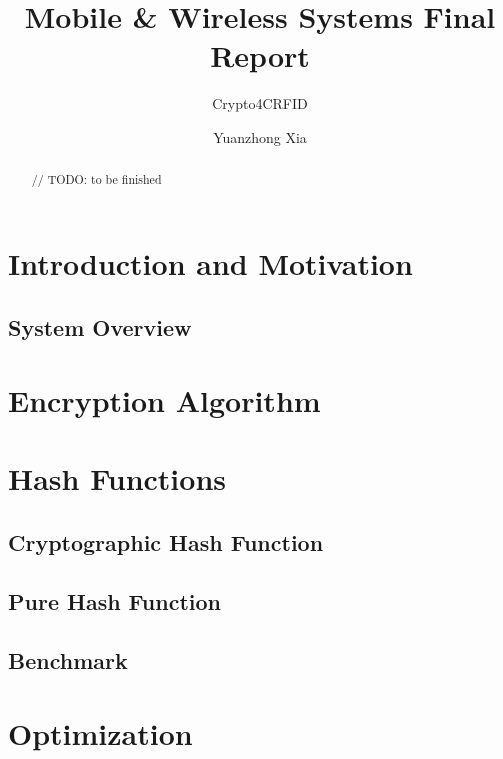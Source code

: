 \documentclass[sigconf, review=false]{acmart}
\begin{document}
\title{Mobile & Wireless Systems Final Report}
\subtitle{Crypto4CRFID}

\author{Yuanzhong Xia}

\begin{abstract}
    // TODO: to be finished

\end{abstract}
\maketitle



\section{Introduction and Motivation}

\subsection{System Overview}


\section{Encryption Algorithm}


\section{Hash Functions}
\subsection{Cryptographic Hash Function}

\subsection{Pure Hash Function}

\subsection{Benchmark}


\section{Optimization}
\end{document}
